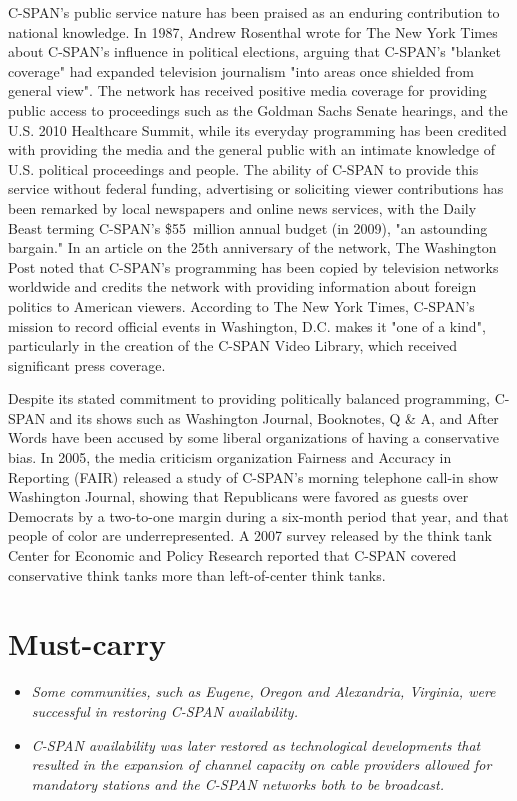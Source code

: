 C-SPAN's public service nature has been praised as an enduring
contribution to national knowledge. In 1987, Andrew Rosenthal wrote for
The New York Times about C-SPAN's influence in political elections,
arguing that C-SPAN's "blanket coverage" had expanded television
journalism "into areas once shielded from general view". The network has
received positive media coverage for providing public access to
proceedings such as the Goldman Sachs Senate hearings, and the U.S. 2010
Healthcare Summit, while its everyday programming has been credited with
providing the media and the general public with an intimate knowledge of
U.S. political proceedings and people. The ability of C-SPAN to provide
this service without federal funding, advertising or soliciting viewer
contributions has been remarked by local newspapers and online news
services, with the Daily Beast terming C-SPAN's \$55~million annual
budget (in 2009), "an astounding bargain." In an article on the 25th
anniversary of the network, The Washington Post noted that C-SPAN's
programming has been copied by television networks worldwide and credits
the network with providing information about foreign politics to
American viewers. According to The New York Times, C-SPAN's mission to
record official events in Washington, D.C. makes it "one of a kind",
particularly in the creation of the C-SPAN Video Library, which received
significant press coverage.

Despite its stated commitment to providing politically balanced
programming, C-SPAN and its shows such as Washington Journal, Booknotes,
Q \& A, and After Words have been accused by some liberal organizations
of having a conservative bias. In 2005, the media criticism organization
Fairness and Accuracy in Reporting (FAIR) released a study of C-SPAN's
morning telephone call-in show Washington Journal, showing that
Republicans were favored as guests over Democrats by a two-to-one margin
during a six-month period that year, and that people of color are
underrepresented. A 2007 survey released by the think tank Center for
Economic and Policy Research reported that C-SPAN covered conservative
think tanks more than left-of-center think tanks.

\section{Must-carry}\label{must-carry}

\begin{itemize}
\item
  \emph{Some communities, such as Eugene, Oregon and Alexandria,
  Virginia, were successful in restoring C-SPAN availability.}
\item
  \emph{C-SPAN availability was later restored as technological
  developments that resulted in the expansion of channel capacity on
  cable providers allowed for mandatory stations and the C-SPAN networks
  both to be broadcast.}
\end{itemize}

